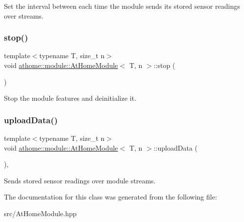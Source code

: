 Set the interval between each time the module sends its stored sensor readings over streams. \mbox{\label{classathome_1_1module_1_1_at_home_module_a5589c1eb7edd2ab45d0a3de7bb475bbe}} 
\subsubsection{\texorpdfstring{stop()}{stop()}}
{\footnotesize\ttfamily template$<$typename T, size\+\_\+t n$>$ \\
void \mbox{\hyperlink{classathome_1_1module_1_1_at_home_module}{athome\+::module\+::\+At\+Home\+Module}}$<$ T, n $>$\+::stop (\begin{DoxyParamCaption}{ }\end{DoxyParamCaption})\hspace{0.3cm}{\ttfamily [inline]}}

Stop the module features and deinitialize it. \mbox{\label{classathome_1_1module_1_1_at_home_module_a4fd5a07603ff4cb512d201352aa2be0a}} 
\subsubsection{\texorpdfstring{upload\+Data()}{uploadData()}}
{\footnotesize\ttfamily template$<$typename T, size\+\_\+t n$>$ \\
void \mbox{\hyperlink{classathome_1_1module_1_1_at_home_module}{athome\+::module\+::\+At\+Home\+Module}}$<$ T, n $>$\+::upload\+Data (\begin{DoxyParamCaption}{ }\end{DoxyParamCaption})\hspace{0.3cm}{\ttfamily [inline]}, {\ttfamily [protected]}}

Sends stored sensor readings over module streams. 

The documentation for this class was generated from the following file\+:\begin{DoxyCompactItemize}
\item 
src/At\+Home\+Module.\+hpp\end{DoxyCompactItemize}
